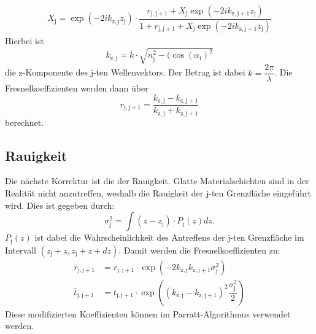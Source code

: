 \begin{align}
  \label{eqn:Parratt-Algorithmus}
X_\mathrm{j}= \exp(-2i k_\mathrm{z,j}z_\mathrm{j})\cdot\dfrac{r_\mathrm{j,j+1}+X_\mathrm{j}\exp(-2i k_\mathrm{z,j+1}z_\mathrm{j})}{1+r_\mathrm{j,j+1}+X_\mathrm{j}\exp(-2i k_\mathrm{z,j+1}z_\mathrm{j})}
\end{align}
Hierbei ist
\begin{equation}
  \label{eqn:kzj}
 k_\mathrm{z,j}= k\cdot\sqrt{n_\mathrm{j}^2-(\cos(\alpha_\mathrm{i})^2}
\end{equation}
die z-Komponente des j-ten Wellenvektors. Der Betrag ist dabei $k=\dfrac{2\pi}{\lambda}$. Die Fresnelkoeffizienten werden dann über
\begin{equation}
  \label{eqn:Veränderten Fresnelkoefizienten}
  r_\mathrm{j,j+1}= \dfrac{k_\mathrm{z,j}-k_\mathrm{z,j+1}}{ k_\mathrm{z,j}+ k_\mathrm{z,j+1}}
\end{equation}
berechnet.
\subsection{Rauigkeit}
\label{sec:Rauigkeit}
Die nächste Korrektur ist die der Rauigkeit. Glatte Materialschichten sind in der Realität nicht anzutreffen, weshalb die Rauigkeit der j-ten Grenzfläche eingeführt wird. Dies ist gegeben durch:
\begin{equation}
  \label{eqn:rms}
\sigma_\mathrm{j}^2= \int (z-z_\mathrm{j})\cdot P_\mathrm{j}(z) dz.
\end{equation}
$P_\mathrm{j}(z)$ ist dabei die Wahrscheinlichkeit des Antreffens der j-ten Grenzfläche im Intervall $(z_\mathrm{j}+z,z_\mathrm{j}+z+dz)$.
Damit werden die Fresnelkoeffizienten zu:
\begin{align}
  \label{eqn:modkoeff}
  \overline{r}_\mathrm{j,j+1}&=r_\mathrm{j,j+1}\cdot\exp(-2 k_\mathrm{z,j} k_\mathrm{z,j+1}\sigma_\mathrm{j}^2) \\
  \label{eqn:modkoeff2}
  \overline{t}_\mathrm{j,j+1}&=t_\mathrm{j,j+1}\cdot\exp\left(( k_\mathrm{z,j}-k_\mathrm{z,j+1})^2 \dfrac{\sigma_\mathrm{j}^2}{2}\right)
\end{align}
Diese modifizierten Koeffizienten können im Parratt-Algorithmus verwendet werden.
